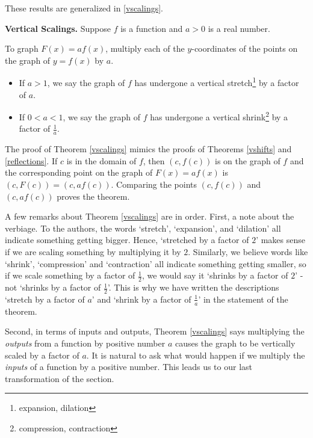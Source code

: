 These results are generalized in \autoref{vscalings}.

\begin{ithm} \label{vscalings}\textbf{Vertical Scalings.} Suppose $f$ is a function and $a>0$ is a real number. 

To graph $F(x) = af(x)$, multiply each of the $y$-coordinates of the points on the graph of $y=f(x)$ by $a$. 

\begin{itemize}

\item If $a > 1$, we say the graph of $f$ has undergone a vertical stretch\footnote{expansion, dilation} by a factor of $a$. 

\item If $0 < a < 1$, we say the graph of $f$ has undergone a vertical shrink\footnote{ compression, contraction} by a factor of $\frac{1}{a}$.

\end{itemize}

\end{ithm}

The proof of Theorem \ref{vscalings} mimics the proofs of Theorems \ref{vshifts} and \ref{reflections}.  If $c$ is in the domain of $f$, then $(c, f(c))$ is on the graph of $f$ and the corresponding point on the graph of $F(x)=af(x)$ is $(c, F(c)) = (c, a f(c))$.  Comparing the points $(c, f(c))$ and $(c, a f(c))$ proves the theorem.  

A few remarks about Theorem \ref{vscalings} are in order.  First, a note about the verbiage.  To the authors, the words `stretch', `expansion', and `dilation' all indicate something getting bigger.  Hence, `stretched by a factor of $2$' makes sense if we are scaling something by multiplying it by $2$. Similarly, we believe words like `shrink', `compression' and `contraction' all indicate something getting smaller, so if we scale something by a factor of $\frac{1}{2}$, we would say it `shrinks by a factor of $2$' - not `shrinks by a factor of $\frac{1}{2}$'.  This is why we have written the descriptions `stretch by a factor of $a$' and `shrink by a factor of $\frac{1}{a}$' in the statement of the theorem.  

Second, in terms of inputs and outputs, Theorem \ref{vscalings} says multiplying the \textit{outputs} from a function by positive number $a$ causes the graph to be vertically scaled by a factor of $a$.  It is natural to ask what would happen if we multiply the \textit{inputs} of a function by a positive number.  This leads us to our last transformation of the section.

